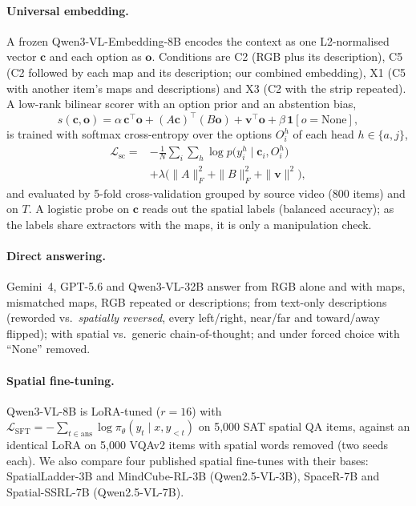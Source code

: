 \paragraph{Universal embedding.}
A frozen Qwen3-VL-Embedding-8B encodes the context as one L2-normalised vector $\mathbf c$ and each option as $\mathbf o$. Conditions are C2 (RGB plus its description), C5 (C2 followed by each map and its description; our combined embedding), X1 (C5 with another item's maps and descriptions) and X3 (C2 with the strip repeated). A low-rank bilinear scorer with an option prior and an abstention bias,
\begin{equation}
s(\mathbf c,\mathbf o)=\alpha\,\mathbf c^{\top}\mathbf o+(A\mathbf c)^{\top}(B\mathbf o)+\mathbf v^{\top}\mathbf o+\beta\,\mathbf 1[o=\text{None}],
\end{equation}
is trained with softmax cross-entropy over the options $O^{h}_i$ of each head $h\in\{a,j\}$,
\begin{equation}
\begin{split}
\mathcal L_{\mathrm{sc}}={}&-\tfrac1N\textstyle\sum_{i}\sum_{h}\log p\big(y^{h}_i\mid\mathbf c_i,O^{h}_i\big)\\
&+\lambda\big(\|A\|_F^2+\|B\|_F^2+\|\mathbf v\|^2\big),
\end{split}
\end{equation}
and evaluated by 5-fold cross-validation grouped by source video (800 items) and on $T$. A logistic probe on $\mathbf c$ reads out the spatial labels (balanced accuracy); as the labels share extractors with the maps, it is only a manipulation check.

\paragraph{Direct answering.}
Gemini~4, GPT-5.6 and Qwen3-VL-32B answer from RGB alone and with maps, mismatched maps, RGB repeated or descriptions; from text-only descriptions (reworded vs.\ \emph{spatially reversed}, every left/right, near/far and toward/away flipped); with spatial vs.\ generic chain-of-thought; and under forced choice with ``None'' removed.

\paragraph{Spatial fine-tuning.}
Qwen3-VL-8B is LoRA-tuned ($r{=}16$) with $\mathcal L_{\mathrm{SFT}}=-\sum_{t\in\mathrm{ans}}\log\pi_\theta(y_t\mid x,y_{<t})$ on 5,000 SAT spatial QA items, against an identical LoRA on 5,000 VQAv2 items with spatial words removed (two seeds each). We also compare four published spatial fine-tunes with their bases: SpatialLadder-3B and MindCube-RL-3B (Qwen2.5-VL-3B), SpaceR-7B and Spatial-SSRL-7B (Qwen2.5-VL-7B).

